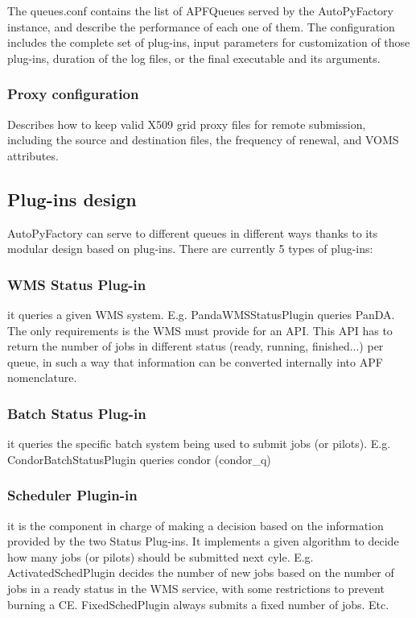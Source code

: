 \documentclass[a4paper]{jpconf}
\begin{document}
The queues.conf contains the list of APFQueues served by the AutoPyFactory instance,
and describe the performance of each one of them. 
The configuration includes the complete set of plug-ins, 
input parameters for customization of those plug-ins, 
duration of the log files, 
or the final executable and its arguments.

\subsubsection{Proxy configuration}

Describes how to keep valid X509 grid proxy files for remote submission,
including the source and destination files, 
the frequency of renewal, 
and VOMS attributes.

\subsection{Plug-ins design}

AutoPyFactory can serve to different queues in different ways 
thanks to its modular design based on plug-ins. 
There are currently 5 types of plug-ins:

\subsubsection{WMS Status Plug-in} 

it queries a given WMS system. E.g. PandaWMSStatusPlugin queries PanDA. 
The only requirements is the WMS must provide for an API. 
This API has to return the number of jobs in different status (ready, running, finished...) per queue, 
in such a way that information can be converted internally into APF nomenclature. 

\subsubsection{Batch Status Plug-in} 

it queries the specific batch system being used to submit jobs (or pilots). 
E.g. CondorBatchStatusPlugin queries condor (condor\_q)

\subsubsection{Scheduler Plugin-in} 

it is the component in charge of making a decision based on the information provided by the two Status Plug-ins. 
It implements a given algorithm to decide how many jobs (or pilots) should be submitted next cyle. 
E.g. ActivatedSchedPlugin decides the number of new jobs based on the number of jobs in a ready status in the WMS service, 
with some restrictions to prevent burning a CE. 
FixedSchedPlugin always submits a fixed number of jobs. Etc.
\end{document}
